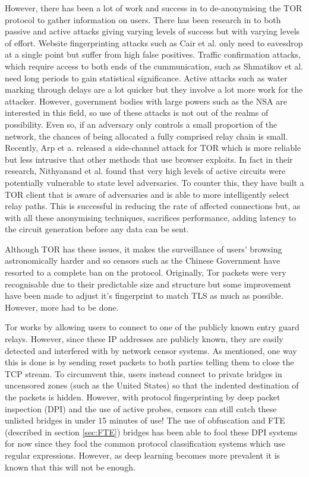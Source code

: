 \documentclass[10pt,a4paper]{article}
\begin{document}
However, there has been a lot of work and success in to de-anonymising the TOR protocol to gather information on users. There has been research in to both passive and active attacks  giving varying levels of success but with varying levels of effort. Website fingerprinting attacks such as Cair et al.\cite{webfinger} only need to eavesdrop at a single point but suffer from high false positives. Traffic confirmation attacks, which require access to both ends of the cummunication, such as Shmatikov et al.\cite{conf} need long periods to gain statistical significance. Active attacks such as water marking through delays are a lot quicker but they involve a lot more work for the attacker. However, government bodies with large powers such as the NSA are interested in this field, so use of these attacks is not out of the realms of possibility. Even so, if an adversary only controls a small proportion of the network, the chances of being allocated a fully comprised relay chain is small. Recently, Arp et a.\cite{torben} released a side-channel attack for TOR which is more reliable but less intrusive that other methods that use browser exploits. In fact in their research, Nithyanand et al.\cite{AS} found that very high levels of active circuits were potentially vulnerable to state level adversaries. To counter this, they have built a TOR client that is aware of adversaries and is able to more intelligently select relay paths. This is successful in reducing the rate of affected connections but, as with all these anonymising techniques, sacrifices performance, adding latency to the circuit generation before any data can be sent.

Although TOR has these issues, it makes the surveillance of users' browsing astronomically harder and so censors such as the Chinese Government have resorted to a complete ban on the protocol. Originally, Tor packets were very recognisable due to their predictable size and structure but some improvement have been made to adjust it's fingerprint to match TLS as much as possible. However, more had to be done.

Tor works by allowing users to connect to one of the publicly known entry guard relays. However, since these IP addresses are publicly known, they are easily detected and interfered with by network censor systems. As mentioned, one way this is done is by sending reset packets to both parties telling them to close the TCP stream.
To circumvent this, users instead connect to private bridges in uncensored zones (such as the United States) so that the indented destination of the packets is hidden. However, with protocol fingerprinting by deep packet inspection (DPI) and the use of active probes, censors can still catch these unlisted bridges in under 15 minutes of use!
The use of obfuscation and FTE (described in section \ref{sec:FTE}) bridges has been able to fool these DPI systems for now since they fool the common protocol classification systems which use regular expressions. However, as deep learning becomes more prevalent it is known that this will not be enough.
\end{document}
